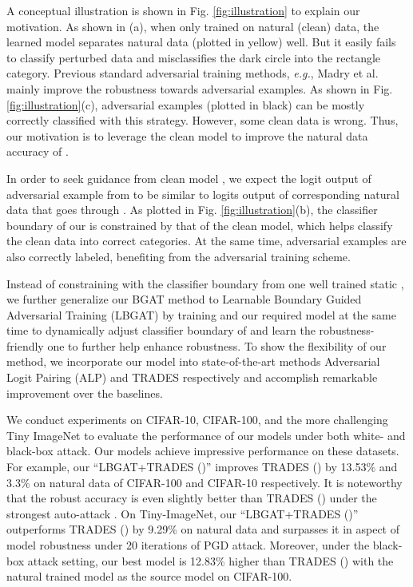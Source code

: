 \documentclass[final]{cvpr}
\begin{document}
A conceptual illustration is shown in Fig. \ref{fig:illustration} to explain our motivation. As shown in (a), when only trained on natural (clean) data, the learned model  separates natural data (plotted in yellow) well. But it easily fails to classify perturbed data and misclassifies the dark circle into the rectangle category. Previous standard adversarial training methods, {\it e.g.}, Madry et al. \cite{DBLP:conf/iclr/MadryMSTV18} mainly improve the robustness towards adversarial examples. As shown in Fig. \ref{fig:illustration}(c), adversarial examples (plotted in black) can be mostly correctly classified with this strategy. However, some clean data is wrong. Thus, our motivation is to leverage the clean model  to improve the natural data accuracy of .

In order to seek guidance from clean model , we expect the logit output of adversarial example  from  to be similar to logits output of corresponding natural data  that goes through . As plotted in Fig. \ref{fig:illustration}(b), the classifier boundary of our  is constrained by that of the clean model, which helps classify the clean data into correct categories. At the same time, adversarial examples are also correctly labeled, benefiting from the adversarial training scheme.

Instead of constraining  with the classifier boundary from one well trained static ,
we further generalize our BGAT method to Learnable Boundary Guided Adversarial Training (LBGAT) by training  and our required model  at the same time to dynamically adjust classifier boundary of  and learn the robustness-friendly one to further help  enhance robustness. To show the flexibility of our method, we incorporate our model into state-of-the-art methods Adversarial Logit Pairing (ALP) \cite{DBLP:journals/corr/abs-1803-06373} and TRADES \cite{zhang2019theoretically} respectively and accomplish remarkable improvement over the baselines.

We conduct experiments on CIFAR-10, CIFAR-100, and the more challenging Tiny ImageNet to evaluate the performance of our models under both white- and black-box attack. Our models achieve impressive performance on these datasets. For example, our ``LBGAT+TRADES ()'' improves TRADES () by 13.53\% and 3.3\% on natural data of CIFAR-100 and CIFAR-10 respectively. It is noteworthy that the robust accuracy is even slightly better than TRADES () under the strongest auto-attack \cite{croce2020reliable}. On Tiny-ImageNet, our ``LBGAT+TRADES ()'' outperforms TRADES () by 9.29\% on natural data and surpasses it in aspect of model robustness under 20 iterations of PGD attack.
Moreover, under the black-box attack setting, our best model is 12.83\% higher than TRADES () with the natural trained model as the source model on CIFAR-100.
\end{document}

